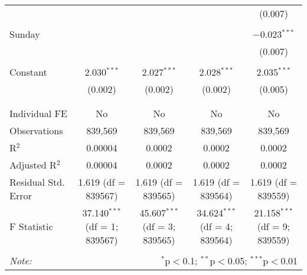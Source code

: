\documentclass[
]{article}
\begin{document}
\begin{table}[!htbp]
{\begin{tabular}{@{\extracolsep{5pt}}lcccc}
  &  &  &  & (0.007) \\ 
  & & & & \\ 
 Sunday &  &  &  & $-$0.023$^{***}$ \\ 
  &  &  &  & (0.007) \\ 
  & & & & \\ 
 Constant & 2.030$^{***}$ & 2.027$^{***}$ & 2.028$^{***}$ & 2.035$^{***}$ \\ 
  & (0.002) & (0.002) & (0.002) & (0.005) \\ 
  & & & & \\ 
\hline \\[-1.8ex] 
Individual FE & No & No & No & No \\ 
Observations & 839,569 & 839,569 & 839,569 & 839,569 \\ 
R$^{2}$ & 0.00004 & 0.0002 & 0.0002 & 0.0002 \\ 
Adjusted R$^{2}$ & 0.00004 & 0.0002 & 0.0002 & 0.0002 \\ 
Residual Std. Error & 1.619 (df = 839567) & 1.619 (df = 839565) & 1.619 (df = 839564) & 1.619 (df = 839559) \\ 
F Statistic & 37.140$^{***}$ (df = 1; 839567) & 45.607$^{***}$ (df = 3; 839565) & 34.624$^{***}$ (df = 4; 839564) & 21.158$^{***}$ (df = 9; 839559) \\ 
\hline 
\hline \\[-1.8ex] 
\textit{Note:}  & \multicolumn{4}{r}{$^{*}$p$<$0.1; $^{**}$p$<$0.05; $^{***}$p$<$0.01} \\ 
\end{tabular}
} 
\end{table} 
\newpage
\end{document}
